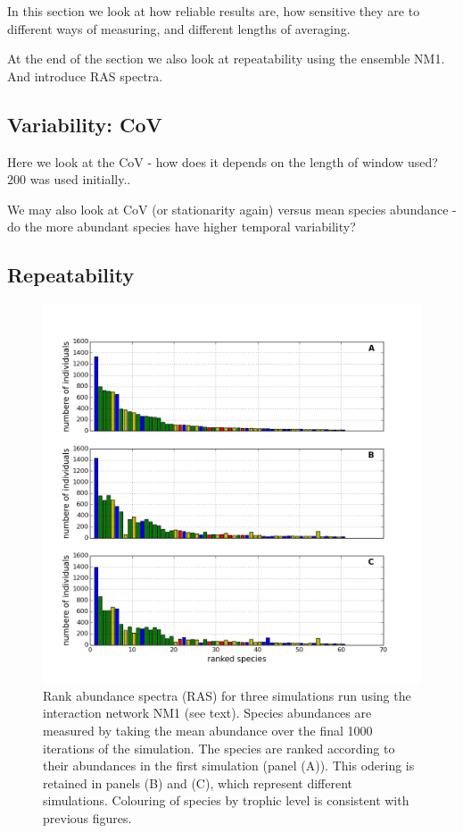 In this section we look at how reliable results are, how sensitive they are to different ways of measuring, and different lengths of averaging. 

At the end of the section we also look at repeatability using the ensemble NM1. And introduce RAS spectra.

\subsection{Variability: CoV}

Here we look at the CoV - how does it depends on the length of window used? 200 was used initially..

We may also look at CoV (or stationarity again) versus mean species abundance - do the more abundant species have higher temporal variability?

\subsection{Repeatability}

\begin{figure}[hp]
	\centering
	\includegraphics[width=1.0\linewidth]{"./chapters/chapter04b/figures/ras_3examples"}
    \caption{Rank abundance spectra (RAS) for three simulations run using the interaction network NM1 (see text). Species abundances are measured by taking the mean abundance over the final 1000 iterations of the simulation. The species are ranked according to their abundances in the first simulation (panel (A)). This odering is retained in panels (B) and (C), which represent different simulations. Colouring of species by trophic level is consistent with previous figures.}    
    \label{fig:ras_3examples}
\end{figure}


